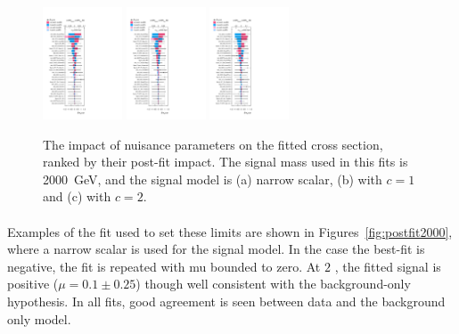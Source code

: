 \begin{figure}[htbp!]
\begin{center}
\includegraphics[width=0.21\textwidth]{figures/boosted/results/ranking_okt18_s_2000.pdf} 
\includegraphics[width=0.21\textwidth]{figures/boosted/results/ranking_okt18_g10_2000.pdf} 
\includegraphics[width=0.21\textwidth]{figures/boosted/results/ranking_okt18_g20_2000.pdf} 
\caption{The impact of nuisance parameters on the fitted cross section, ranked by their post-fit impact. The signal mass used in this fits is 2000~GeV, and the signal model is (a) narrow scalar, (b) \Grav with $c=1$ and (c) \Grav with  $c=2$.}
\label{fig:ranking2000}
\end{center}
\end{figure}


\paragraph{}
Examples of the fit used to set these limits are shown in Figures~\ref{fig:postfit2000}, where a narrow scalar is used for the signal model. 
In the case the best-fit is negative, the fit is repeated with mu bounded to zero. 
At $2$ \TeV, the fitted signal is positive ($\mu=0.1\pm0.25$) though well consistent with the background-only hypothesis. 
In all fits, good agreement is seen between data and the background only model.

